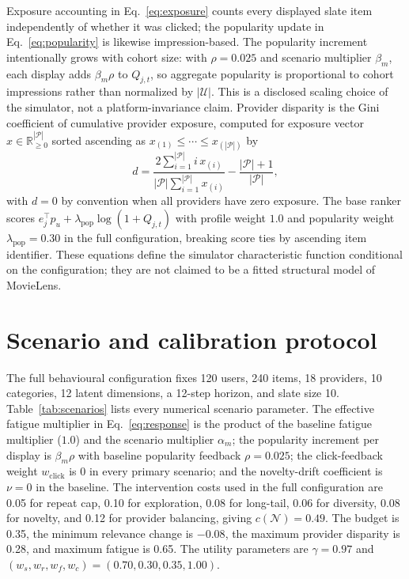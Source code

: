 \documentclass[pdflatex,sn-mathphys-num]{sn-jnl}
\theoremstyle{thmstyleone}
\theoremstyle{thmstyletwo}
\theoremstyle{thmstylethree}
\newcommand{\Players}{\mathcal{N}}
\begin{document}
\begin{appendices}
Exposure accounting in Eq.~\eqref{eq:exposure} counts every displayed slate item independently of whether it was clicked; the popularity update in Eq.~\eqref{eq:popularity} is likewise impression-based. The popularity increment intentionally grows with cohort size: with $\rho=0.025$ and scenario multiplier $\beta_m$, each display adds $\beta_m\rho$ to $Q_{j,t}$, so aggregate popularity is proportional to cohort impressions rather than normalized by $|\mathcal{U}|$. This is a disclosed scaling choice of the simulator, not a platform-invariance claim. Provider disparity is the Gini coefficient of cumulative provider exposure, computed for exposure vector $x\in\mathbb{R}_{\geq0}^{|\mathcal{P}|}$ sorted ascending as $x_{(1)}\leq\cdots\leq x_{(|\mathcal{P}|)}$ by
\begin{equation}
 d=\frac{2\sum_{i=1}^{|\mathcal{P}|}i\,x_{(i)}}{|\mathcal{P}|\sum_{i=1}^{|\mathcal{P}|}x_{(i)}}-\frac{|\mathcal{P}|+1}{|\mathcal{P}|},
\label{eq:gini}
\end{equation}
with $d=0$ by convention when all providers have zero exposure. The base ranker scores $e_j^\top p_u+\lambda_{\mathrm{pop}}\log(1+Q_{j,t})$ with profile weight $1.0$ and popularity weight $\lambda_{\mathrm{pop}}=0.30$ in the full configuration, breaking score ties by ascending item identifier. These equations define the simulator characteristic function conditional on the configuration; they are not claimed to be a fitted structural model of MovieLens.

\section{Scenario and calibration protocol}\label{app:protocol}
The full behavioural configuration fixes 120 users, 240 items, 18 providers, 10 categories, 12 latent dimensions, a 12-step horizon, and slate size 10. Table~\ref{tab:scenarios} lists every numerical scenario parameter. The effective fatigue multiplier in Eq.~\eqref{eq:response} is the product of the baseline fatigue multiplier ($1.0$) and the scenario multiplier $\alpha_m$; the popularity increment per display is $\beta_m\rho$ with baseline popularity feedback $\rho=0.025$; the click-feedback weight $w_{\mathrm{click}}$ is $0$ in every primary scenario; and the novelty-drift coefficient is $\nu=0$ in the baseline. The intervention costs used in the full configuration are 0.05 for repeat cap, 0.10 for exploration, 0.08 for long-tail, 0.06 for diversity, 0.08 for novelty, and 0.12 for provider balancing, giving $c(\Players)=0.49$. The budget is 0.35, the minimum relevance change is $-0.08$, the maximum provider disparity is 0.28, and maximum fatigue is 0.65. The utility parameters are $\gamma=0.97$ and $(w_s,w_r,w_f,w_c)=(0.70,0.30,0.35,1.00)$.


\end{appendices}
\end{document}
